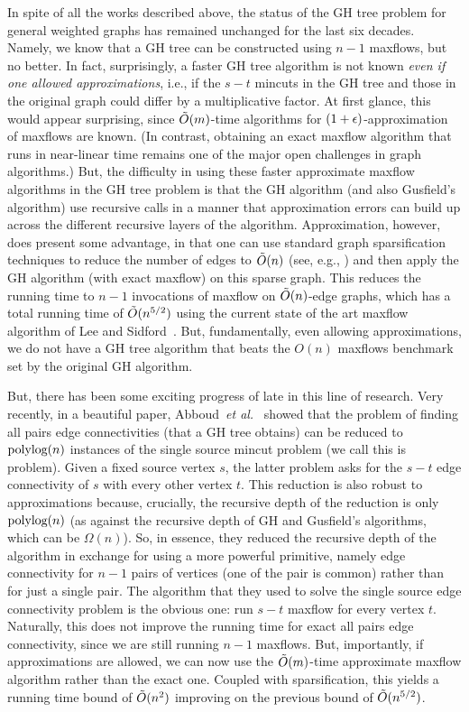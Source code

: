 In spite of all the works described above, the status of the GH tree problem for general weighted graphs has remained unchanged for the last six decades. Namely, we know that a GH tree can be constructed using $n-1$ maxflows, but no better. In fact, surprisingly, a faster GH tree algorithm is not known {\em even if one allowed approximations}, i.e., if the $s-t$ mincuts in the GH tree and those in the original graph could differ by a multiplicative factor. At first glance, this would appear surprising, since $\tilde{O}(m)$-time algorithms for  $(1+\epsilon)$-approximation of maxflows are known. (In contrast, obtaining an exact maxflow algorithm that runs in near-linear time remains one of the major open challenges in graph algorithms.) But, the difficulty in using these faster approximate maxflow algorithms in the GH tree problem is that the GH algorithm (and also Gusfield's algorithm) use recursive calls in a manner that approximation errors can build up across the different recursive layers of the algorithm. Approximation, however, does present some advantage, in that one can use standard graph sparsification techniques to reduce the number of edges to $\tilde{O}(n)$ (see, e.g., \cite{BenczurK00,FungHKP11}) and then apply the GH algorithm (with exact maxflow) on this sparse graph. This reduces the running time to $n-1$ invocations of maxflow on $\tilde{O}(n)$-edge graphs, which has a total running time of $\tilde{O}(n^{5/2})$ using the current state of the art maxflow algorithm of Lee and Sidford~\cite{Lees14}. But, fundamentally, even allowing approximations, we do not have a GH tree algorithm that beats the $O(n)$ maxflows benchmark set by the original GH algorithm.

But, there has been some exciting progress of late in this line of research. Very recently, in a beautiful paper, Abboud~{\em et al.}~\cite{AbboudKT20b} showed that the problem of finding all pairs edge connectivities (that a GH tree obtains) can be reduced to $\textup{polylog}(n)$ instances of the single source mincut problem (we call this is \ssc problem). Given a fixed source vertex $s$, the latter problem asks for the $s-t$ edge connectivity of $s$ with every other vertex $t$. This reduction is also robust to approximations because, crucially, the recursive depth of the reduction is only $\textup{polylog}(n)$ (as against the recursive depth of GH and Gusfield's algorithms, which can be $\Omega(n)$). So, in essence, they reduced the recursive depth of the algorithm in exchange for using a more powerful primitive, namely edge connectivity for $n-1$ pairs of vertices (one of the pair is common) rather than for just a single pair. The algorithm that they used to solve the single source edge connectivity problem is the obvious one: run $s-t$ maxflow for every vertex $t$. Naturally, this does not improve the running time for exact all pairs edge connectivity, since we are still running $n-1$ maxflows. But, importantly, if approximations are allowed, we can now use the $\tilde{O}(m)$-time approximate maxflow algorithm rather than the exact one. Coupled with sparsification, this yields a running time bound of $\tilde{O}(n^2)$ improving on the previous bound of $\tilde{O}(n^{5/2})$. 

